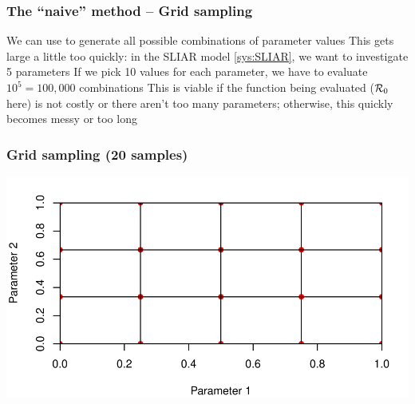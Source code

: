 \documentclass[aspectratio=169]{beamer}\usepackage[]{graphicx}\usepackage[]{xcolor}
\makeatletter
\def\maxwidth{ %
  \ifdim\Gin@nat@width>\linewidth
    \linewidth
  \else
    \Gin@nat@width
  \fi
}
\newenvironment{knitrout}{}{} %
\makeatother
\begin{document}
\begin{frame}\frametitle{The ``naive'' method -- Grid sampling}
We can use  to generate all possible combinations of parameter values
\vfill
This gets large a little too quickly: in the SLIAR model \eqref{sys:SLIAR}, we want to investigate 5 parameters
\vfill
If we pick 10 values for each parameter, we have to evaluate $10^5=100,000$ combinations
\vfill
This is viable if the function being evaluated ($\mathcal{R}_0$ here) is not costly or there aren't too many parameters; otherwise, this quickly becomes messy or too long
\end{frame}


\begin{frame}[fragile]\frametitle{Grid sampling (20 samples)}
\begin{knitrout}
\color{fgcolor}
\includegraphics[width=\maxwidth]{FIGS/comp-analysis-grid-sampling-2d-example-1} 
\end{knitrout}
\end{frame}
\end{document}
